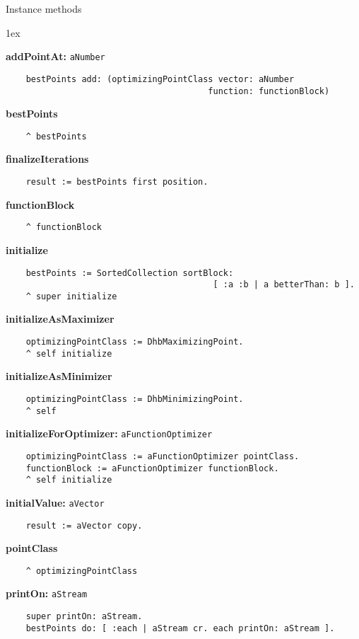Instance methods
{\parskip 1ex\par\noindent}
{\bf addPointAt:} {\tt aNumber}
\begin{verbatim}
    bestPoints add: (optimizingPointClass vector: aNumber
                                        function: functionBlock)
\end{verbatim}
{\bf bestPoints}
\begin{verbatim}
    ^ bestPoints
\end{verbatim}
{\bf finalizeIterations}
\begin{verbatim}
    result := bestPoints first position.
\end{verbatim}
{\bf functionBlock}
\begin{verbatim}
    ^ functionBlock
\end{verbatim}
{\bf initialize}
\begin{verbatim}
    bestPoints := SortedCollection sortBlock:
                                         [ :a :b | a betterThan: b ].
    ^ super initialize
\end{verbatim}
{\bf initializeAsMaximizer}
\begin{verbatim}
    optimizingPointClass := DhbMaximizingPoint.
    ^ self initialize
\end{verbatim}
{\bf initializeAsMinimizer}
\begin{verbatim}
    optimizingPointClass := DhbMinimizingPoint.
    ^ self
\end{verbatim}
{\bf initializeForOptimizer:} {\tt aFunctionOptimizer}
\begin{verbatim}
    optimizingPointClass := aFunctionOptimizer pointClass.
    functionBlock := aFunctionOptimizer functionBlock.
    ^ self initialize
\end{verbatim}
{\bf initialValue:} {\tt aVector}
\begin{verbatim}
    result := aVector copy.
\end{verbatim}
{\bf pointClass}
\begin{verbatim}
    ^ optimizingPointClass
\end{verbatim}
{\bf printOn:} {\tt aStream}
\begin{verbatim}
    super printOn: aStream.
    bestPoints do: [ :each | aStream cr. each printOn: aStream ].
\end{verbatim}
